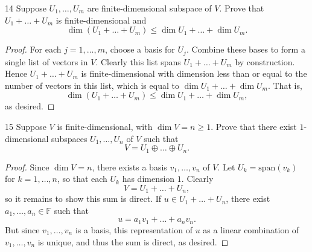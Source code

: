 \documentclass{extarticle}
\newenvironment{problem}[1]{\begin{prob*}{#1}{}}{\end{prob*}}
\newcommand{\F}{\mathbb{F}}
\newcommand{\Span}{\mathrm{span}}
\begin{document}
\begin{problem}{14}
Suppose $U_1,\dots,U_m$ are finite-dimensional subspace of $V$.  Prove that $U_1 + \dots + U_m$ is finite-dimensional and 
\begin{equation*}
\dim\left(U_1  + \dots + U_m\right)\leq \dim U_1 + \dots + \dim U_m.
\end{equation*}
\end{problem}
\begin{proof}
For each $j = 1,\dots,m$, choose a basis for $U_j$.  Combine these bases to form a single list of vectors in $V$.  Clearly this list spans $U_1 + \dots + U_m$ by construction.  Hence $U_1 + \dots + U_m$ is finite-dimensional with dimension less than or equal to the number of vectors in this list, which is equal to $\dim U_1 + \dots + \dim U_m$.  That is,
\begin{equation*}
\dim\left(U_1 + \dots + U_m\right)\leq \dim U_1 + \dots + \dim U_m,
\end{equation*} 
as desired.
\end{proof}

\begin{problem}{15}
Suppose $V$ is finite-dimensional, with $\dim V= n\geq 1$.  Prove that there exist $1$-dimensional subspaces $U_1,\dots, U_n$ of $V$ such that 
\begin{equation*}
V = U_1\oplus \dots \oplus U_n.
\end{equation*}
\end{problem}
\begin{proof}
Since $\dim V = n$, there exists a basis $v_1,\dots, v_n$ of $V$.  Let $U_k = \Span(v_k)$ for $k = 1,\dots, n$, so that each $U_k$ has dimension $1$.  Clearly 
\begin{equation*}
V = U_1 + \dots + U_n,
\end{equation*}
so it remains to show this sum is direct.  If $u \in U_1 + \dots + U_n$, there exist $a_1,\dots, a_n\in\F$ such that
\begin{equation*}
u = a_1v_1 + \dots + a_nv_n.
\end{equation*}
But since $v_1,\dots, v_n$ is a basis, this representation of $u$ as a linear combination of $v_1,\dots,v_n$ is unique, and thus the sum is direct, as desired.
\end{proof}
\end{document}
